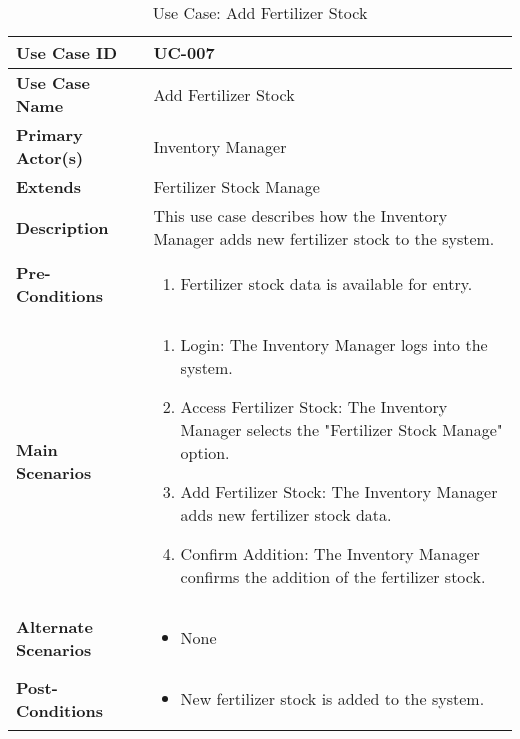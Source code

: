\documentclass{article}
\begin{document}
\begin{table}[!ht]
    \centering
    \renewcommand{\arraystretch}{1.3} %
    \begin{tabularx}{\textwidth}{|l|X|}
        \hline
        \textbf{Use Case ID} & UC-007 \\
        \hline
        \textbf{Use Case Name} & Add Fertilizer Stock \\
        \hline
        \textbf{Primary Actor(s)} & Inventory Manager \\
        \hline
        \textbf{Extends} & Fertilizer Stock Manage \\
        \hline
        \textbf{Description} & This use case describes how the Inventory Manager adds new fertilizer stock to the system. \\
        \hline
        \textbf{Pre-Conditions} & 
        \begin{enumerate}[label=\arabic*.,itemsep=0pt]
            \item Fertilizer stock data is available for entry.
        \end{enumerate} \\
        \hline
        \textbf{Main Scenarios} & 
        \begin{enumerate}[label=\arabic*.,itemsep=0pt]
            \item Login: The Inventory Manager logs into the system.
            \item Access Fertilizer Stock: The Inventory Manager selects the "Fertilizer Stock Manage" option.
            \item Add Fertilizer Stock: The Inventory Manager adds new fertilizer stock data.
            \item Confirm Addition: The Inventory Manager confirms the addition of the fertilizer stock.
        \end{enumerate} \\
        \hline
        \textbf{Alternate Scenarios} & 
        \begin{itemize}[label=--,itemsep=0pt]
            \item None
        \end{itemize} \\
        \hline
        \textbf{Post-Conditions} & 
        \begin{itemize}[label=--,itemsep=0pt]
            \item New fertilizer stock is added to the system.
        \end{itemize} \\
        \hline
    \end{tabularx}
    \caption{Use Case: Add Fertilizer Stock}
    \label{tab:use-case-add-fertilizer-stock}
\end{table}
\end{document}
